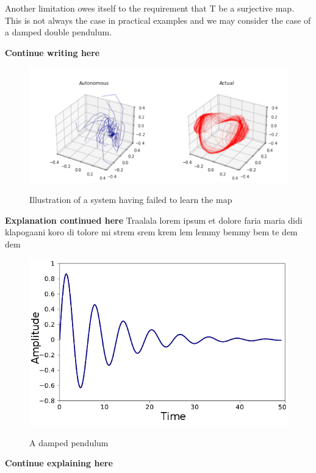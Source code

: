 \documentclass[12 pt]{article}
\begin{document}
Another limitation owes itself to the requirement that T be a surjective map. This is not always the case in practical examples and we may consider the case of a damped double pendulum. 

\textbf{Continue writing here}


\begin{figure}[ht]
  \includegraphics[scale=0.3]{learningfailure.png}
  \centering
  \label{fig:supp_learning_failure}
  \caption{Illustration of a system having failed to learn the map}
\end{figure}


\textbf{Explanation continued here}
Traalala lorem ipsum et dolore faria maria didi klapogaani koro di tolore mi strem srem krem lem lemmy bemmy bem te dem dem 

\begin{figure}[h]
  \includegraphics[scale=0.4]{temporary_damp_fig.png}
  \centering
  \label{fig:damped_pendulum}
\caption{A damped pendulum}
\end{figure}

\textbf{Continue explaining here}

\vspace{-1cm}


\end{document}
